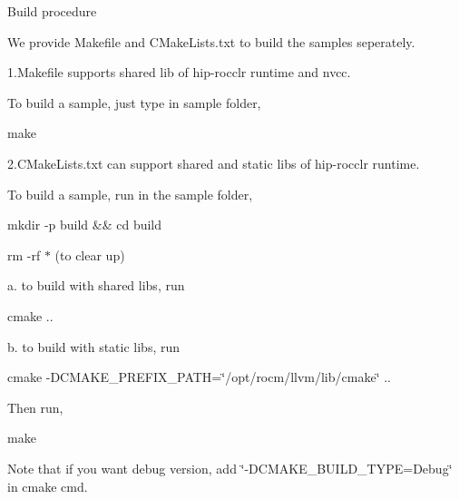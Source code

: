 Build procedure

We provide Makefile and CMake\+Lists.\+txt to build the samples seperately.

1.\+Makefile supports shared lib of hip-\/rocclr runtime and nvcc.

To build a sample, just type in sample folder,

make

2.\+CMake\+Lists.\+txt can support shared and static libs of hip-\/rocclr runtime.

To build a sample, run in the sample folder,

mkdir -\/p build \&\& cd build

rm -\/rf $\ast$ (to clear up)

a. to build with shared libs, run

cmake ..

b. to build with static libs, run

cmake -\/DCMAKE\+\_\+\+PREFIX\+\_\+\+PATH=\char`\"{}/opt/rocm/llvm/lib/cmake\char`\"{} ..

Then run,

make

Note that if you want debug version, add \char`\"{}-\/\+DCMAKE\+\_\+\+BUILD\+\_\+\+TYPE=\+Debug\char`\"{} in cmake cmd. 